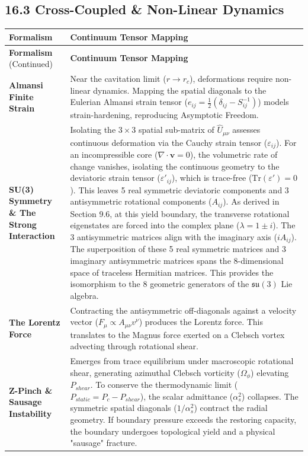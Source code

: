 \subsection*{16.3 Cross-Coupled \& Non-Linear Dynamics}
\renewcommand{\arraystretch}{1.5}
\begin{longtable}{p{} p{}}
    \hline
    \textbf{Formalism} & \textbf{Continuum Tensor Mapping} \\
    \hline
    \endfirsthead
    \hline
    \textbf{Formalism} (Continued) & \textbf{Continuum Tensor Mapping} \\
    \hline
    \endhead
    \hline
    \endfoot
    \textbf{Almansi Finite Strain} & Near the cavitation limit ($r \to r_c$), deformations require non-linear dynamics. Mapping the spatial diagonals to the Eulerian Almansi strain tensor ($e_{ij} = \frac{1}{2}(\delta_{ij} - S_{ij}^{-1})$) models strain-hardening, reproducing Asymptotic Freedom. \\ 
    \textbf{SU(3) Symmetry \& The Strong Interaction} & Isolating the $3 \times 3$ spatial sub-matrix of $\hat{U}_{\mu\nu}$ assesses continuous deformation via the Cauchy strain tensor ($\varepsilon_{ij}$). For an incompressible core ($\nabla \cdot \mathbf{v} = 0$), the volumetric rate of change vanishes, isolating the continuous geometry to the deviatoric strain tensor ($\varepsilon'_{ij}$), which is trace-free ($\text{Tr}(\varepsilon') = 0$). This leaves 5 real symmetric deviatoric components and 3 antisymmetric rotational components ($A_{ij}$). As derived in Section 9.6, at this yield boundary, the transverse rotational eigenstates are forced into the complex plane ($\lambda = 1 \pm i$). The 3 antisymmetric matrices align with the imaginary axis ($i A_{ij}$). The superposition of these 5 real symmetric matrices and 3 imaginary antisymmetric matrices spans the 8-dimensional space of traceless Hermitian matrices. This provides the isomorphism to the 8 geometric generators of the $\mathfrak{su}(3)$ Lie algebra. \\ 
    \textbf{The Lorentz Force} & Contracting the antisymmetric off-diagonals against a velocity vector ($F_\mu \propto A_{\mu\nu} v^\nu$) produces the Lorentz force. This translates to the Magnus force exerted on a Clebsch vortex advecting through rotational shear. \\ 
    \textbf{Z-Pinch \& Sausage Instability} & Emerges from trace equilibrium under macroscopic rotational shear, generating azimuthal Clebsch vorticity ($\Omega_\phi$) elevating $P_{shear}$.  To conserve the thermodynamic limit ($P_{static} = P_c - P_{shear}$), the scalar admittance ($\alpha_s^2$) collapses. The symmetric spatial diagonals ($1/\alpha_s^2$) contract the radial geometry. If boundary pressure exceeds the restoring capacity, the boundary undergoes topological yield and a physical "sausage" fracture. \\

\end{longtable}
